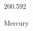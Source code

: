 \documentclass[12pt]{article}
\begin{document}
\hfill{}
\vfill
\begin{center}
  {\fontsize{50}{60}
  }

  \vspace{1em}

  200.592

Mercury
\end{center}
\vfill
\end{document}
